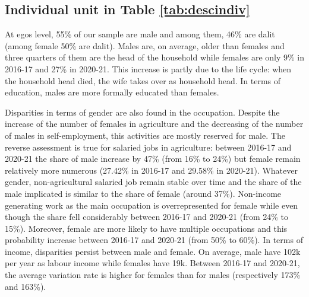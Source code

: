 \documentclass[a4paper, 11pt, onecolumn]{article}
\begin{document}

	\subsection{Individual unit in Table \ref{tab:descindiv}}

At egos level, 55\% of our sample are male and among them, 46\% are dalit (among female 50\% are dalit).
Males are, on average, older than females and three quarters of them are the head of the household while females are only 9\% in 2016-17 and 27\% in 2020-21.
This increase is partly due to the life cycle: when the household head died, the wife takes over as household head.
In terms of education, males are more formally educated than females.

Disparities in terms of gender are also found in the occupation.
Despite the increase of the number of females in agriculture and the decreasing of the number of males in self-employment, this activities are mostly reserved for male.
The reverse assessment is true for salaried jobs in agriculture: between 2016-17 and 2020-21 the share of male increase by 47\% (from 16\% to 24\%) but female remain relatively more numerous (27.42\% in 2016-17 and 29.58\% in 2020-21). 
Whatever gender, non-agricultural salaried job remain stable over time and the share of the male implicated is similar to the share of female (around 37\%).
Non-income generating work as the main occupation is overrepresented for female while even though the share fell considerably between 2016-17 and 2020-21 (from 24\% to 15\%).
Moreover, female are more likely to have multiple occupations and this probability increase between 2016-17 and 2020-21 (from 50\% to 60\%).
In terms of income, disparities persist between male and female.
On average, male have \rupee102k per year as labour income while females have \rupee19k.
Between 2016-17 and 2020-21, the average variation rate is higher for females than for males (respectively 173\% and 163\%).
\end{document}
